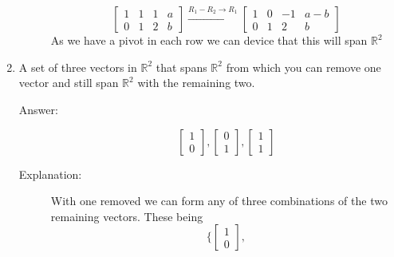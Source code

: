 \documentclass{article}
\begin{document}
\begin{enumerate}
\begin{description}
                                    \[
                                    \left[\begin{array}{ccc|c}
                                    1 & 1 & 1 & a \\
                                    0 & 1 & 2 & b
                                    \end{array}\right]
                                    \xrightarrow{R_1 - R_2 \rightarrow R_1}
                                    \left[\begin{array}{ccc|c}
                                    1 & 0 & -1 & a - b \\
                                    0 & 1 & 2 & b
                                    \end{array}\right]
                                    \]
                                    As we have a pivot in each row we can device that this will span $\mathbb{R}^2$
                            \end{description}
                        \item 
                            A set of three vectors in $\mathbb{R}^2$ that spans $\mathbb{R}^2$ from which you can remove
                            one vector and still span $\mathbb{R}^2$ with the remaining two.
                            \begin{description}
                                \item[Answer:] 
                                    \[
                                    \begin{bmatrix}1 \\ 0\end{bmatrix},
                                    \begin{bmatrix}0 \\ 1\end{bmatrix},
                                    \begin{bmatrix}1 \\ 1\end{bmatrix}
                                    \]
                                \item[Explanation:]
                                    With one removed we can form any of three combinations of the two remaining vectors.
                                    These being
                                    \[
                                    \{
                                        \begin{bmatrix}1 \\ 0\end{bmatrix},
\]
\end{description}
\end{enumerate}
\end{document}

